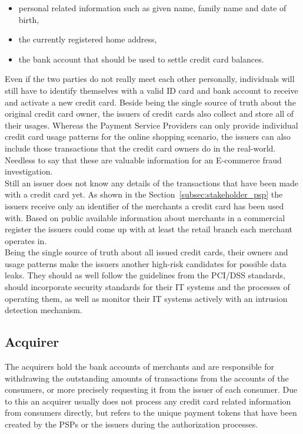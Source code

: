 \begin{itemize}
		\item personal related information such as given name, family name and date of birth,
		\item the currently registered home address,
		\item the bank account that should be used to settle credit card balances.
\end{itemize}

Even if the two parties do not really meet each other personally, individuals will still have to identify themselves with a valid ID card and bank account to receive and activate a new credit card. Beside being the single source of truth about the original credit card owner, the issuers of credit cards also collect and store all of their usages. Whereas the Payment Service Providers can only provide individual credit card usage patterns for the online shopping scenario, the issuers can also include those transactions that the credit card owners do in the real-world. Needless to say that these are valuable information for an \gls{E-commerce} fraud investigation. \\

Still an issuer does not know any details of the transactions that have been made with a credit card yet. As shown in the Section~\ref{subsec:stakeholder_psp} the issuers receive only an identifier of the merchants a credit card has been used with. Based on public available information about merchants in a commercial register the issuers could come up with at least the retail branch each merchant operates in. \\

Being the single source of truth about all issued credit cards, their owners and usage patterns make the issuers another high-risk candidates for possible data leaks. They should as well follow the guidelines from the \gls{PCI/DSS} standards, should incorporate security standards for their \gls{IT} systems and the processes of operating them, as well as monitor their \gls{IT} systems actively with an intrusion detection mechanism.


\subsection{Acquirer}
\label{subsec:stakeholder_acquirer}

The acquirers hold the bank accounts of merchants and are responsible for withdrawing the outstanding amounts of transactions from the accounts of the consumers, or more precisely requesting it from the issuer of each consumer. Due to this an acquirer usually does not process any credit card related information from consumers directly, but refers to the unique payment tokens that have been created by the \gls{PSP}s or the issuers during the authorization processes. \\

